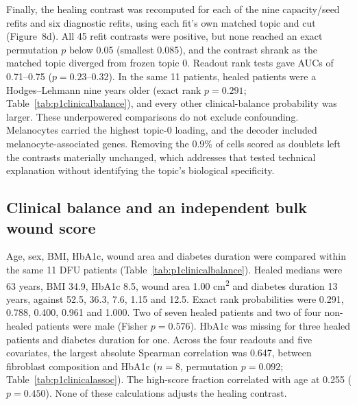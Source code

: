 \documentclass[10pt,a4paper]{article}
\begin{document}
Finally, the healing contrast was recomputed for each of the nine capacity/seed refits and six diagnostic refits, using each fit's own matched topic and cut (Figure~8d). All 45 refit contrasts were positive, but none reached an exact permutation $p$ below 0.05 (smallest 0.085), and the contrast shrank as the matched topic diverged from frozen topic 0. Readout rank tests gave AUCs of 0.71--0.75 ($p=0.23$--0.32). In the same 11 patients, healed patients were a Hodges--Lehmann nine years older (exact rank $p=0.291$; Table~\ref{tab:p1clinicalbalance}), and every other clinical-balance probability was larger. These underpowered comparisons do not exclude confounding. Melanocytes carried the highest topic-0 loading, and the decoder included melanocyte-associated genes. Removing the 0.9\% of cells scored as doublets left the contrasts materially unchanged, which addresses that tested technical explanation without identifying the topic's biological specificity.




\subsection{Clinical balance and an independent bulk wound score}

Age, sex, BMI, HbA1c, wound area and diabetes duration were compared within the same 11 DFU patients (Table~\ref{tab:p1clinicalbalance}). Healed medians were 63 years, BMI 34.9, HbA1c 8.5, wound area 1.00 cm\textsuperscript{2} and diabetes duration 13 years, against 52.5, 36.3, 7.6, 1.15 and 12.5. Exact rank probabilities were 0.291, 0.788, 0.400, 0.961 and 1.000. Two of seven healed patients and two of four non-healed patients were male (Fisher $p=0.576$). HbA1c was missing for three healed patients and diabetes duration for one. Across the four readouts and five covariates, the largest absolute Spearman correlation was 0.647, between fibroblast composition and HbA1c ($n=8$, permutation $p=0.092$; Table~\ref{tab:p1clinicalassoc}). The high-score fraction correlated with age at 0.255 ($p=0.450$). None of these calculations adjusts the healing contrast.
\end{document}
